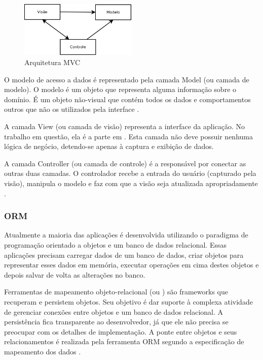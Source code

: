 \begin{figure}[htbp]
\centering
\includegraphics[width=0.5\textwidth]{fig/diagrama_mvc.png}
\caption{Arquitetura MVC}
\label{fig:diag_mvc}
\end{figure}

O modelo de acesso a dados é representado pela camada Model (ou camada de modelo). O modelo 
é um objeto que representa alguma informação sobre o domínio. É um objeto não-visual 
que contém todos os dados e comportamentos outros que não os utilizados 
pela interface \cite{Fowler:2006}.

A camada View (ou camada de visão) representa a interface da aplicação. No trabalho
em questão, ela é a parte em . Esta camada não deve possuir nenhuma lógica de negócio,
detendo-se apenas à captura e exibição de dados.

A camada Controller (ou camada de controle) é a responsável por conectar as outras duas
camadas. O controlador recebe a entrada do usuário (capturado pela visão), manipula o 
modelo e faz com que a visão seja atualizada apropriadamente \cite{Fowler:2006}.

\subsubsection{ORM}
Atualmente a maioria das aplicações é desenvolvida utilizando o paradigma de programação 
orientado a objetos e um banco de dados relacional. Essas aplicações precisam carregar
dados de um banco de dados, criar objetos para representar esses dados em memória,
executar operações em cima destes objetos e depois salvar de volta as alterações no banco.

Ferramentas de mapeamento objeto-relacional (ou ) são frameworks que recuperam e persistem
objetos. Seu objetivo é dar suporte à complexa atividade de gerenciar conexões entre
objetos e um banco de dados relacional. A persistência fica transparente ao desenvolvedor,
já que ele não precisa se preocupar com os detalhes de implementação. A ponte entre
objetos e seus relacionamentos é realizada pela ferramenta ORM segundo a especificação 
de mapeamento dos dados \cite{springerlink}.

